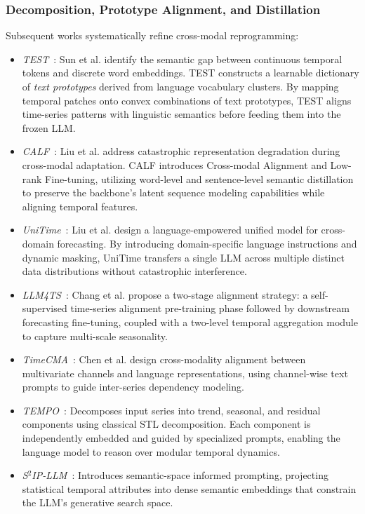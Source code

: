 \subsubsection{Decomposition, Prototype Alignment, and Distillation}
Subsequent works systematically refine cross-modal reprogramming:
\begin{itemize}[leftmargin=*]
    \item \emph{TEST}~\cite{sun2023test}: Sun et al. identify the semantic gap between continuous temporal tokens and discrete word embeddings. TEST constructs a learnable dictionary of \emph{text prototypes} derived from language vocabulary clusters. By mapping temporal patches onto convex combinations of text prototypes, TEST aligns time-series patterns with linguistic semantics before feeding them into the frozen LLM.
    \item \emph{CALF}~\cite{liu2024calf}: Liu et al. address catastrophic representation degradation during cross-modal adaptation. CALF introduces Cross-modal Alignment and Low-rank Fine-tuning, utilizing word-level and sentence-level semantic distillation to preserve the backbone's latent sequence modeling capabilities while aligning temporal features.
    \item \emph{UniTime}~\cite{liu2024unitime}: Liu et al. design a language-empowered unified model for cross-domain forecasting. By introducing domain-specific language instructions and dynamic masking, UniTime transfers a single LLM across multiple distinct data distributions without catastrophic interference.
    \item \emph{LLM4TS}~\cite{chang2023llm4ts}: Chang et al. propose a two-stage alignment strategy: a self-supervised time-series alignment pre-training phase followed by downstream forecasting fine-tuning, coupled with a two-level temporal aggregation module to capture multi-scale seasonality.
    \item \emph{TimeCMA}~\cite{chen2024timecma}: Chen et al. design cross-modality alignment between multivariate channels and language representations, using channel-wise text prompts to guide inter-series dependency modeling.
    \item \emph{TEMPO}~\cite{cao2023tempo}: Decomposes input series into trend, seasonal, and residual components using classical STL decomposition. Each component is independently embedded and guided by specialized prompts, enabling the language model to reason over modular temporal dynamics.
    \item \emph{S$^2$IP-LLM}~\cite{wu2024s2ipllm}: Introduces semantic-space informed prompting, projecting statistical temporal attributes into dense semantic embeddings that constrain the LLM's generative search space.

\end{itemize}
